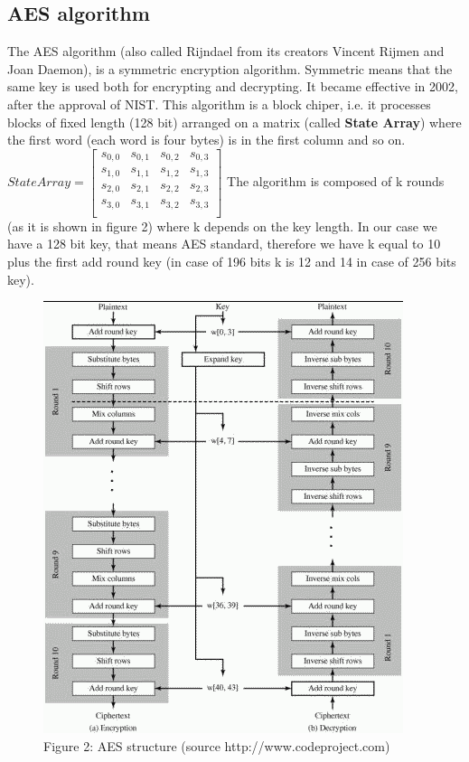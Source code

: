 \subsection{AES algorithm}
The AES algorithm (also called Rijndael from its creators Vincent Rijmen and Joan Daemon), is a symmetric encryption algorithm. Symmetric means that the same key is used both for encrypting and decrypting. It became effective in 2002, after the approval of NIST. This algorithm is a block chiper, i.e. it processes blocks of fixed length (128 bit) arranged on a matrix (called \textbf{State Array}) where the first word (each word is four bytes) is in the first column and so on. 
$State Array = 
\begin{bmatrix}
s_{0,0} & s_{0,1} & s_{0,2} & s_{0,3} \\ 
s_{1,0} & s_{1,1} & s_{1,2} & s_{1,3} \\
s_{2,0} & s_{2,1} & s_{2,2} & s_{2,3} \\
s_{3,0} & s_{3,1} & s_{3,2} & s_{3,3} \\
\end{bmatrix}
$
The algorithm is composed of k rounds (as it is shown in figure 2) where k  depends on the key length. In our case we have a 128 bit key, that means AES standard, therefore we have k equal to 10 plus the first add round key  (in case of 196 bits k is 12 and 14 in case of 256 bits key).
\newpage
\begin{figure}[htbp]
\centering
\includegraphics[scale=1]{AES_structure.png}
\\Figure 2: AES structure (source http://www.codeproject.com)
\end{figure}

